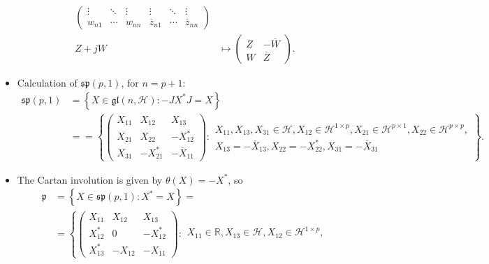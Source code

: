 \documentclass{report}
\begin{document}
\begin{itemize}
\begin{align*}
\begin{pmatrix}
            \vdots & \ddots & \vdots & \vdots & \ddots & \vdots \\
            w_{n1} & \cdots & w_{nn} & \overline z_{n1} & \cdots & \overline z_{nn}
        \end{pmatrix}\\
        Z + j W
        &\mapsto \begin{pmatrix}
            Z & -\overline W \\
            W & \overline Z
        \end{pmatrix}.
    \end{align*}
    \item Calculation of $\mathfrak{sp}(p,1)$, for $n = p+1$:
    \begin{align*}
        \mathfrak{sp}(p,1) &= \left\{ X \in \mathfrak{gl}(n, \mathcal H): - J X^* J = X \right\}\\
        &==
        \left\{
            \begin{pmatrix}
                X_{11} & X_{12} & X_{13} \\
                X_{21} & X_{22} & -X_{12}^* \\
                X_{31} & -X_{21}^* & -\overline X_{11}
            \end{pmatrix} :
            \begin{array}{c}
                X_{11}, X_{13}, X_{31} \in \mathcal H, X_{12} \in \mathcal H^{1 \times p}, X_{21} \in \mathcal H^{p \times 1}, X_{22} \in \mathcal H^{p \times p},\\
                X_{13} = -\overline X_{13}, X_{22} = -X_{22}^*, X_{31} = -\overline X_{31}
            \end{array}
        \right\}.
    \end{align*}
    \item The Cartan involution is given by $\theta(X) = -X^*$, so
    \begin{align*}
        \mathfrak p &= \left\{ X \in \mathfrak{sp}(p,1): X^* = X \right\} =\\
        &=
        \left\{
            \begin{pmatrix}
                X_{11} & X_{12} & X_{13} \\
                X_{12}^* & 0 & -X_{12}^* \\
                X_{13}^* & -X_{12} & -X_{11}
            \end{pmatrix} :
            \begin{array}{c}
                X_{11} \in \mathbb R, X_{13} \in \mathcal H, X_{12} \in \mathcal H^{1 \times p},\\

\end{array}
\end{align*}
\end{itemize}
\end{document}
